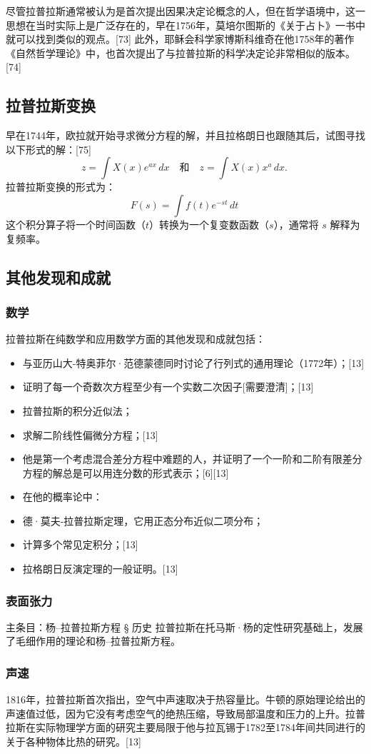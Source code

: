 尽管拉普拉斯通常被认为是首次提出因果决定论概念的人，但在哲学语境中，这一思想在当时实际上是广泛存在的，早在1756年，莫培尔图斯的《关于占卜》一书中就可以找到类似的观点。[73] 此外，耶稣会科学家博斯科维奇在他1758年的著作《自然哲学理论》中，也首次提出了与拉普拉斯的科学决定论非常相似的版本。[74]
\subsection{拉普拉斯变换}    
早在1744年，欧拉就开始寻求微分方程的解，并且拉格朗日也跟随其后，试图寻找以下形式的解：[75]  
\[ z = \int X(x) e^{ax} \, dx \quad \text{和} \quad z = \int X(x) x^a \, dx. ~\]
拉普拉斯变换的形式为：
\[
F(s) = \int f(t) e^{-st} \, dt~
\]
这个积分算子将一个时间函数（\( t \)）转换为一个复变数函数（\( s \)），通常将 \( s \) 解释为复频率。
\subsection{其他发现和成就}  
\subsubsection{数学}
拉普拉斯在纯数学和应用数学方面的其他发现和成就包括：
\begin{itemize}
\item 与亚历山大-特奥菲尔·范德蒙德同时讨论了行列式的通用理论（1772年）；[13]
\item 证明了每一个奇数次方程至少有一个实数二次因子[需要澄清]；[13]
\item 拉普拉斯的积分近似法；
\item 求解二阶线性偏微分方程；[13]
\item 他是第一个考虑混合差分方程中难题的人，并证明了一个一阶和二阶有限差分方程的解总是可以用连分数的形式表示；[6][13]
\item 在他的概率论中：
\item 德·莫夫-拉普拉斯定理，它用正态分布近似二项分布；
\item 计算多个常见定积分；[13]
\item 拉格朗日反演定理的一般证明。[13]
\end{itemize}
\subsubsection{表面张力}  
主条目：杨–拉普拉斯方程 § 历史  
拉普拉斯在托马斯·杨的定性研究基础上，发展了毛细作用的理论和杨–拉普拉斯方程。
\subsubsection{声速}  
1816年，拉普拉斯首次指出，空气中声速取决于热容量比。牛顿的原始理论给出的声速值过低，因为它没有考虑空气的绝热压缩，导致局部温度和压力的上升。拉普拉斯在实际物理学方面的研究主要局限于他与拉瓦锡于1782至1784年间共同进行的关于各种物体比热的研究。[13]
